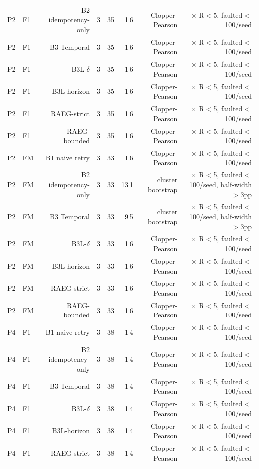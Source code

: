 \begin{table}[t]
\begin{tabular}{llrrrrrr}
P2 & F1 & B2 idempotency-only & 3 & 35 & 1.6 & Clopper-Pearson & $\times$ R$<$5, faulted$<$100/seed \\
P2 & F1 & B3 Temporal & 3 & 35 & 1.6 & Clopper-Pearson & $\times$ R$<$5, faulted$<$100/seed \\
P2 & F1 & B3L-$\delta$ & 3 & 35 & 1.6 & Clopper-Pearson & $\times$ R$<$5, faulted$<$100/seed \\
P2 & F1 & B3L-horizon & 3 & 35 & 1.6 & Clopper-Pearson & $\times$ R$<$5, faulted$<$100/seed \\
P2 & F1 & RAEG-strict & 3 & 35 & 1.6 & Clopper-Pearson & $\times$ R$<$5, faulted$<$100/seed \\
P2 & F1 & RAEG-bounded & 3 & 35 & 1.6 & Clopper-Pearson & $\times$ R$<$5, faulted$<$100/seed \\
P2 & FM & B1 naive retry & 3 & 33 & 1.6 & Clopper-Pearson & $\times$ R$<$5, faulted$<$100/seed \\
P2 & FM & B2 idempotency-only & 3 & 33 & 13.1 & cluster bootstrap & $\times$ R$<$5, faulted$<$100/seed, half-width$>$3pp \\
P2 & FM & B3 Temporal & 3 & 33 & 9.5 & cluster bootstrap & $\times$ R$<$5, faulted$<$100/seed, half-width$>$3pp \\
P2 & FM & B3L-$\delta$ & 3 & 33 & 1.6 & Clopper-Pearson & $\times$ R$<$5, faulted$<$100/seed \\
P2 & FM & B3L-horizon & 3 & 33 & 1.6 & Clopper-Pearson & $\times$ R$<$5, faulted$<$100/seed \\
P2 & FM & RAEG-strict & 3 & 33 & 1.6 & Clopper-Pearson & $\times$ R$<$5, faulted$<$100/seed \\
P2 & FM & RAEG-bounded & 3 & 33 & 1.6 & Clopper-Pearson & $\times$ R$<$5, faulted$<$100/seed \\
P4 & F1 & B1 naive retry & 3 & 38 & 1.4 & Clopper-Pearson & $\times$ R$<$5, faulted$<$100/seed \\
P4 & F1 & B2 idempotency-only & 3 & 38 & 1.4 & Clopper-Pearson & $\times$ R$<$5, faulted$<$100/seed \\
P4 & F1 & B3 Temporal & 3 & 38 & 1.4 & Clopper-Pearson & $\times$ R$<$5, faulted$<$100/seed \\
P4 & F1 & B3L-$\delta$ & 3 & 38 & 1.4 & Clopper-Pearson & $\times$ R$<$5, faulted$<$100/seed \\
P4 & F1 & B3L-horizon & 3 & 38 & 1.4 & Clopper-Pearson & $\times$ R$<$5, faulted$<$100/seed \\
P4 & F1 & RAEG-strict & 3 & 38 & 1.4 & Clopper-Pearson & $\times$ R$<$5, faulted$<$100/seed \\

\end{tabular}
\end{table}
